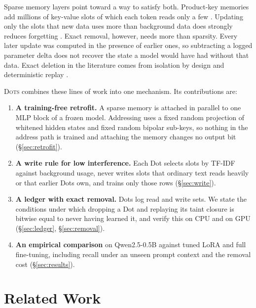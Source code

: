 \documentclass[11pt]{article}
\newcommand{\sys}{\textsc{Dots}}
\begin{document}
Sparse memory layers point toward a way to satisfy both. Product-key memories add millions of key-value slots of which each token reads only a few \citep{lample2019pkm,berges2024memory}. Updating only the slots that new data uses more than background data does strongly reduces forgetting \citep{lin2025smf,goyal2026improving,gupta2026smf}. Exact removal, however, needs more than sparsity. Every later update was computed in the presence of earlier ones, so subtracting a logged parameter delta does not recover the state a model would have had without that data. Exact deletion in the literature comes from isolation by design and deterministic replay \citep{bourtoule2021sisa,x2025trace,kuo2025sift}.

\sys{} combines these lines of work into one mechanism. Its contributions are:

\begin{enumerate}
  \item \textbf{A training-free retrofit.} A sparse memory is attached in parallel to one MLP block of a frozen model. Addressing uses a fixed random projection of whitened hidden states and fixed random bipolar sub-keys, so nothing in the address path is trained and attaching the memory changes no output bit (\S\ref{sec:retrofit}).
  \item \textbf{A write rule for low interference.} Each Dot selects slots by TF-IDF against background usage, never writes slots that ordinary text reads heavily or that earlier Dots own, and trains only those rows (\S\ref{sec:write}).
  \item \textbf{A ledger with exact removal.} Dots log read and write sets. We state the conditions under which dropping a Dot and replaying its taint closure is bitwise equal to never having learned it, and verify this on CPU and on GPU (\S\ref{sec:ledger}, \S\ref{sec:removal}).
  \item \textbf{An empirical comparison} on Qwen2.5-0.5B against tuned LoRA and full fine-tuning, including recall under an unseen prompt context and the removal cost (\S\ref{sec:results}).
\end{enumerate}

\section{Related Work}
\end{document}
